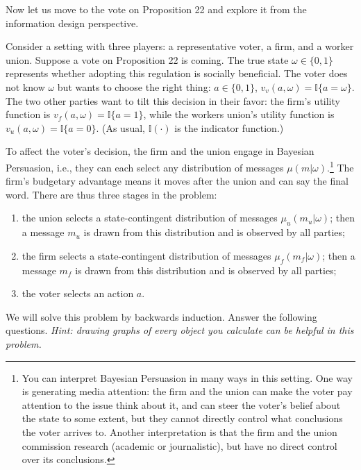 \documentclass[a4paper]{article}
\begin{document}
	Now let us move to the vote on Proposition 22 and explore it from the information design perspective.
	
	Consider a setting with three players: a representative voter, a firm, and a worker union. Suppose a vote on Proposition 22 is coming. The true state $\omega \in \{0,1\}$ represents whether adopting this regulation is socially beneficial. The voter does not know $\omega$ but wants to choose the right thing: $a \in \{0,1\}$, $v_v(a,\omega) = \mathbb{I}\{a=\omega\}$. The two other parties want to tilt this decision in their favor: the firm's utility function is $v_f(a,\omega) = \mathbb{I}\{a=1\}$, while the workers union's utility function is $v_u(a,\omega) = \mathbb{I}\{a=0\}$. (As usual, $\mathbb{I}(\cdot)$ is the indicator function.)
	
	To affect the voter's decision, the firm and the union engage in Bayesian Persuasion, i.e., they can each select any distribution of messages $\mu(m|\omega)$.\footnote{You can interpret Bayesian Persuasion in many ways in this setting. One way is generating media attention: the firm and the union can make the voter pay attention to the issue think about it, and can steer the voter's belief about the state to some extent, but they cannot directly control what conclusions the voter arrives to. Another interpretation is that the firm and the union commission research (academic or journalistic), but have no direct control over its conclusions.}
	The firm's budgetary advantage means it moves after the union and can say the final word. There are thus three stages in the problem:
	\begin{enumerate}[label=(\roman{enumi})]
		\item the union selects a state-contingent distribution of messages $\mu_u(m_u|\omega)$; then a message $m_u$ is drawn from this distribution and is observed by all parties;
		\item the firm selects a state-contingent distribution of messages $\mu_f(m_f|\omega)$; then a message $m_f$ is drawn from this distribution and is observed by all parties;
		\item the voter selects an action $a$.
	\end{enumerate}
	We will solve this problem by backwards induction. Answer the following questions.
	\emph{Hint: drawing graphs of every object you calculate can be helpful in this problem.}
	
\end{document}
